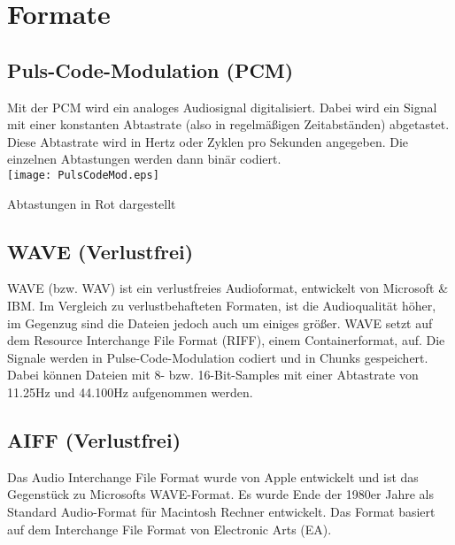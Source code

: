 \documentclass{extarticle}
\begin{document}
		\section{Formate}
		\subsection{Puls-Code-Modulation (PCM)}
		Mit der PCM wird ein analoges Audiosignal digitalisiert. Dabei wird ein Signal mit einer konstanten Abtastrate (also in regelmäßigen Zeitabständen) abgetastet. Diese Abtastrate wird in Hertz oder Zyklen pro Sekunden angegeben. Die einzelnen Abtastungen werden dann binär codiert. \cite{PCMtext} \\
		\texttt{[image: PulsCodeMod.eps]}
		\begin{center} Abtastungen in Rot dargestellt \cite{PCMimg} \end{center}
		
		\subsection{WAVE (Verlustfrei)}
		WAVE (bzw. WAV) ist ein verlustfreies Audioformat, entwickelt von Microsoft \& IBM. Im Vergleich zu verlustbehafteten Formaten, ist die Audioqualität höher, im Gegenzug sind die Dateien jedoch auch um einiges größer. WAVE setzt auf dem Resource Interchange File Format (RIFF), einem Containerformat, auf. Die Signale werden in Pulse-Code-Modulation codiert und in Chunks gespeichert. Dabei können Dateien mit 8- bzw. 16-Bit-Samples mit einer Abtastrate von 11.25Hz und 44.100Hz aufgenommen werden. \cite{WAVE}
		
		\subsection{AIFF (Verlustfrei)}
		Das Audio Interchange File Format wurde von Apple entwickelt und ist das Gegenstück zu Microsofts WAVE-Format. Es wurde Ende der 1980er Jahre als Standard Audio-Format für Macintosh Rechner entwickelt. Das Format basiert auf dem Interchange File Format von Electronic Arts (EA). \cite{AIFF1} \cite{AIFF2}
		
\end{document}
